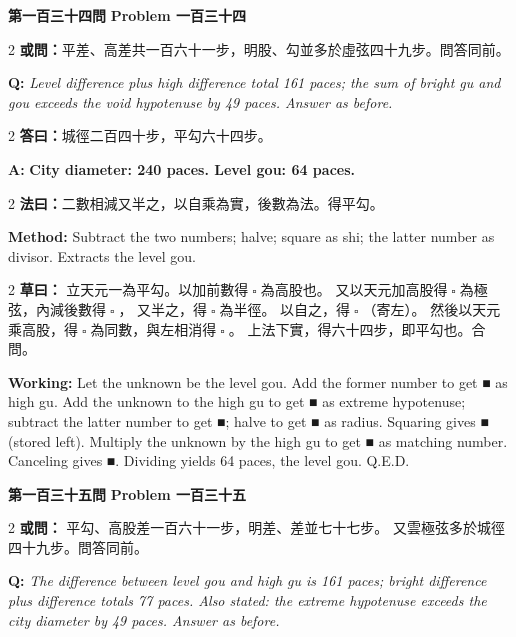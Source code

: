 \documentclass[11pt,a4paper]{article}
\let\origsquare\square
\renewcommand{\square}{\ensuremath{\origsquare}}%
\newcommand{\wen}[1]{%
  \par\vspace{0.5em}%
  \noindent\textcolor{problemcolor}{\textbf{第#1問}}%
  \hfill\textcolor{problemcolor}{\textbf{Problem #1}}\par\nopagebreak%
  \vspace{0.3em}%
}
\newcommand{\owen}[1]{%
  \noindent\textcolor{problemcolor}{\textbf{或問：}}{\tradfont #1}\par\nopagebreak%
}
\newcommand{\oweneng}[1]{%
  \noindent\textcolor{engcolor}{\textbf{Q: }}{\itshape #1}\par\nopagebreak%
}
\newcommand{\fayue}[1]{%
  \noindent\textcolor{methodcolor}{\textbf{法曰：}}{\tradfont #1}\par\nopagebreak%
}
\newcommand{\fayueeng}[1]{%
  \noindent\textcolor{engcolor}{\textbf{Method: }}{#1}\par\nopagebreak%
}
\newcommand{\tsaoyue}[1]{%
  \noindent\textcolor{workcolor}{\textbf{草曰：}}{\tradfont #1}\par%
}
\newcommand{\tsaoyueeng}[1]{%
  \noindent\textcolor{engcolor}{\textbf{Working: }}{\small #1}\par%
}
\newcommand{\dayue}[1]{%
  \noindent\textcolor{anscolor}{\textbf{答曰：}}{\tradfont #1}\par\nopagebreak%
}
\newcommand{\dayueeng}[1]{%
  \noindent\textcolor{engcolor}{\textbf{A: }}{\bfseries #1}\par\nopagebreak%
}
\begin{document}
\vspace{0.5cm}

\wen{一百三十四}

\begin{paracol}{2}
\owen{平差、高差共一百六十一步，明股、勾並多於虛弦四十九步。問答同前。}
\switchcolumn
\oweneng{Level difference plus high difference total 161 paces; the sum of bright gu and gou exceeds the void hypotenuse by 49 paces. Answer as before.}
\end{paracol}

\begin{paracol}{2}
\dayue{城徑二百四十步，平勾六十四步。}
\switchcolumn
\dayueeng{City diameter: 240 paces. Level gou: 64 paces.}
\end{paracol}

\begin{paracol}{2}
\fayue{二數相減又半之，以自乘為實，後數為法。得平勾。}
\switchcolumn
\fayueeng{Subtract the two numbers; halve; square as shi; the latter number as divisor. Extracts the level gou.}
\end{paracol}

\begin{paracol}{2}
\tsaoyue{%
立天元一為平勾。以加前數得$ \; \square \; $為高股也。
又以天元加高股得$ \; \square \; $為極弦，內減後數得$ \; \square \; $，
又半之，得$ \; \square \; $為半徑。
以自之，得$ \; \square \; $（寄左）。
然後以天元乘高股，得$ \; \square \; $為同數，與左相消得$ \; \square \; $。
上法下實，得六十四步，即平勾也。合問。}
\switchcolumn
\tsaoyueeng{%
Let the unknown be the level gou. Add the former number to get ■ as high gu. Add the unknown to the high gu to get ■ as extreme hypotenuse; subtract the latter number to get ■; halve to get ■ as radius. Squaring gives ■ (stored left). Multiply the unknown by the high gu to get ■ as matching number. Canceling gives ■. Dividing yields 64 paces, the level gou. Q.E.D.}
\end{paracol}

\vspace{0.5cm}

\wen{一百三十五}

\begin{paracol}{2}
\owen{%
平勾、高股差一百六十一步，明差、差並七十七步。
又雲極弦多於城徑四十九步。問答同前。}
\switchcolumn
\oweneng{%
The difference between level gou and high gu is 161 paces; bright difference plus difference totals 77 paces. Also stated: the extreme hypotenuse exceeds the city diameter by 49 paces. Answer as before.}
\end{paracol}
\end{document}
